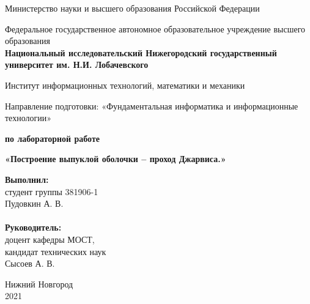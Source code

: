 \documentclass{report}
\begin{document}
\begin{titlepage}

\begin{center}
Министерство науки и высшего образования Российской Федерации
\end{center}

\begin{center}
Федеральное государственное автономное образовательное учреждение высшего образования \\
\textbf{Национальный исследовательский Нижегородский государственный университет им. Н.И. Лобачевского}
\end{center}

\begin{center}
Институт информационных технологий, математики и механики
\end{center}

\begin{center}
Направление подготовки: «Фундаментальная информатика и информационные технологии»
\end{center}

\vspace{4em}

\begin{center}
\textbf{ по лабораторной работе} \\
\end{center}
\begin{center}
\textbf{\Large«Построение выпуклой оболочки – проход Джарвиса.»} \\
\end{center}

\vspace{4em}

\newbox{\lbox}
\newlength{\maxl}
\setlength{\maxl}{\wd\lbox}
\hfill\parbox{7cm}{
\hspace*{5cm}\hspace*{-5cm}\textbf{Выполнил:} \\ студент группы 381906-1 \\ Пудовкин А. В.\\
\\
\hspace*{5cm}\hspace*{-5cm}\textbf{Руководитель:}\\ доцент кафедры МОСТ, \\ кандидат технических наук \\ Сысоев А. В.\\
}
\vspace{\fill}

\begin{center} Нижний Новгород \\ 2021 \end{center}

\end{titlepage}
\end{document}
